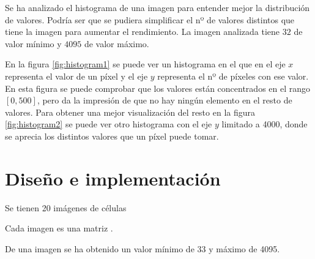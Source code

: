 Se ha analizado el histograma de una imagen para entender mejor la distribución de valores. Podría ser que se pudiera simplificar el nº de valores distintos que tiene la imagen para aumentar el rendimiento. La imagen analizada tiene $ 32 $ de valor mínimo y $ 4095 $ de valor máximo.

En la figura \ref{fig:histogram1} se puede ver un histograma en el que en el eje $ x $ representa el valor de un píxel y el eje $ y $ representa el nº de píxeles con ese valor. En esta figura se puede comprobar que los valores están concentrados en el rango $ [0,500] $, pero da la impresión de que no hay ningún elemento en el resto de valores. Para obtener una mejor visualización del resto en la figura \ref{fig:histogram2} se puede ver otro histograma con el eje $ y $ limitado a 4000, donde se aprecia los distintos valores que un píxel puede tomar. 


\subsubsection{}

\section{Dise\~no e implementaci\'on}


Se tienen 20 imágenes de células

Cada imagen es una matriz .

De una imagen se ha obtenido un valor mínimo de 33 y máximo de 4095.
